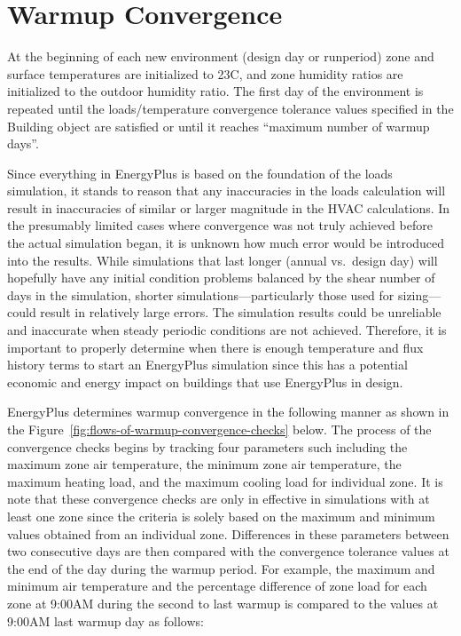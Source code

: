 \section{Warmup Convergence}\label{warmup-convergence}

At the beginning of each new environment (design day or runperiod) zone and surface temperatures are initialized to 23C, and zone humidity ratios are initialized to the outdoor humidity ratio. The first day of the environment is repeated until the loads/temperature convergence tolerance values specified in the Building object are satisfied or until it reaches ``maximum number of warmup days''.

Since everything in EnergyPlus is based on the foundation of the loads simulation, it stands to reason that any inaccuracies in the loads calculation will result in inaccuracies of similar or larger magnitude in the HVAC calculations. In the presumably limited cases where convergence was not truly achieved before the actual simulation began, it is unknown how much error would be introduced into the results. While simulations that last longer (annual vs.~design day) will hopefully have any initial condition problems balanced by the shear number of days in the simulation, shorter simulations---particularly those used for sizing---could result in relatively large errors. The simulation results could be unreliable and inaccurate when steady periodic conditions are not achieved. Therefore, it is important to properly determine when there is enough temperature and flux history terms to start an EnergyPlus simulation since this has a potential economic and energy impact on buildings that use EnergyPlus in design.

EnergyPlus determines warmup convergence in the following manner as shown in the Figure~\ref{fig:flows-of-warmup-convergence-checks} below. The process of the convergence checks begins by tracking four parameters such including the maximum zone air temperature, the minimum zone air temperature, the maximum heating load, and the maximum cooling load for individual zone. It is note that these convergence checks are only in effective in simulations with at least one zone since the criteria is solely based on the maximum and minimum values obtained from an individual zone. Differences in these parameters between two consecutive days are then compared with the convergence tolerance values at the end of the day during the warmup period. For example, the maximum and minimum air temperature and the percentage difference of zone load for each zone at 9:00AM during the second to last warmup is compared to the values at 9:00AM last warmup day as follows:

